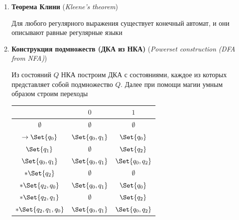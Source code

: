 \documentclass[12pt]{article}
\begin{document}
\begin{enumerate}
\begin{tabular}{c|c}
        \end{tabular}

        \item \textbf{Теорема Клини} (\textit{Kleene's theorem})

        Для любого регулярного выражения существует конечный автомат, и они описывают равные регулярные языки

        \item \textbf{Конструкция подмножеств (ДКА из НКА)} (\textit{Powerset construction (DFA from NFA)})

        Из состояний $Q$ НКА построим ДКА с состояниями, каждое из которых представляет собой подмножество $Q$.
        Далее при помощи магии умным образом строим переходы

        \begin{multicols}{2}

            \smallvspace

            \begin{tabular}{c|cc}
                & $0$              & $1$              \\
                \hline
                $\emptyset$            & $\emptyset$      & $\emptyset$      \\
                \hline
                $\to\Set{q_0}$         & $\Set{q_0, q_1}$ & $\Set{q_0}$      \\
                \hline
                $\Set{q_1}$            & $\emptyset$      & $\Set{q_2}$      \\
                \hline
                $\Set{q_0, q_1}$       & $\Set{q_0, q_1}$ & $\Set{q_0, q_2}$ \\
                \hline
                $*\Set{q_2}$           & $\emptyset$      & $\emptyset$      \\
                \hline
                $*\Set{q_2, q_0}$      & $\Set{q_0, q_1}$ & $\Set{q_0}$      \\
                \hline
                $*\Set{q_2, q_1}$      & $\emptyset$      & $\Set{q_2}$      \\
                \hline
                $*\Set{q_2, q_1, q_0}$ & $\Set{q_0, q_1}$ & $\Set{q_0, q_2}$ \\
            \end{tabular}


\end{multicols}
\end{enumerate}
\end{document}
